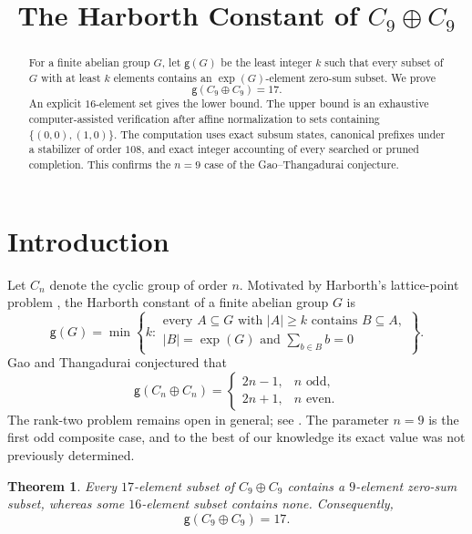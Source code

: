 \documentclass[11pt]{amsart}
\title[The Harborth constant of $C_9\oplus C_9$]
      {The Harborth Constant of $C_9\oplus C_9$}
\date{}
\newtheorem{theorem}{Theorem}
\begin{document}
\begin{abstract}
For a finite abelian group $G$, let $\mathsf g(G)$ be the least integer
$k$ such that every subset of $G$ with at least $k$ elements contains an
$\exp(G)$-element zero-sum subset. We prove
\[
  \mathsf g(C_9\oplus C_9)=17.
\]
An explicit $16$-element set gives the lower bound. The upper bound is an
exhaustive computer-assisted verification after affine normalization to
sets containing $\{(0,0),(1,0)\}$. The computation uses exact subsum
states, canonical prefixes under a stabilizer of order $108$, and exact
integer accounting of every searched or pruned completion. This confirms
the $n=9$ case of the Gao--Thangadurai conjecture.
\end{abstract}

\maketitle

\section{Introduction}

Let $C_n$ denote the cyclic group of order $n$. Motivated by Harborth's
lattice-point problem \cite{Harborth1973}, the Harborth constant of a
finite abelian group $G$ is
\[
  \mathsf g(G)=
  \min\left\{
    k:
    \begin{array}{l}
      \text{every }A\subseteq G\text{ with }|A|\geq k
      \text{ contains }B\subseteq A,\\
      |B|=\exp(G)\text{ and }\displaystyle\sum_{b\in B}b=0
    \end{array}
  \right\}.
\]
Gao and Thangadurai conjectured \cite{GaoThangadurai2004} that
\begin{equation}\label{eq:GT}
  \mathsf g(C_n\oplus C_n)=
  \begin{cases}
    2n-1,& n\text{ odd},\\
    2n+1,& n\text{ even}.
  \end{cases}
\end{equation}
The rank-two problem remains open in general; see
\cite[Section~1.1]{GuillotEtAl2019}. The parameter $n=9$ is the first odd
composite case, and to the best of our knowledge its exact value was not
previously determined.

\begin{theorem}\label{thm:main}
Every $17$-element subset of $C_9\oplus C_9$ contains a $9$-element
zero-sum subset, whereas some $16$-element subset contains none.
Consequently,
\[
  \mathsf g(C_9\oplus C_9)=17.
\]
\end{theorem}
\end{document}
